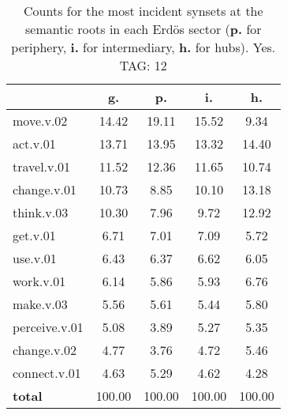 \begin{table}[h!]
\begin{center}
\begin{tabular}{| l || c | c | c | c |}\hline
 & {\bf g.} & {\bf p.} & {\bf i.} & {\bf h.} \\\hline\hline
move.v.02 & 14.42  & 19.11  & 15.52  & 9.34 \\\hline
act.v.01 & 13.71  & 13.95  & 13.32  & 14.40 \\\hline
travel.v.01 & 11.52  & 12.36  & 11.65  & 10.74 \\\hline
change.v.01 & 10.73  & 8.85  & 10.10  & 13.18 \\\hline
think.v.03 & 10.30  & 7.96  & 9.72  & 12.92 \\\hline
get.v.01 & 6.71  & 7.01  & 7.09  & 5.72 \\\hline
use.v.01 & 6.43  & 6.37  & 6.62  & 6.05 \\\hline
work.v.01 & 6.14  & 5.86  & 5.93  & 6.76 \\\hline
make.v.03 & 5.56  & 5.61  & 5.44  & 5.80 \\\hline
perceive.v.01 & 5.08  & 3.89  & 5.27  & 5.35 \\\hline
change.v.02 & 4.77  & 3.76  & 4.72  & 5.46 \\\hline
connect.v.01 & 4.63  & 5.29  & 4.62  & 4.28 \\\hline\hline
{{\bf total}} & 100.00  & 100.00  & 100.00  & 100.00 \\\hline
\end{tabular}
\caption{Counts for the most incident synsets at the semantic roots in each Erd\"os sector ({\bf p.} for periphery, {\bf i.} for intermediary, {\bf h.} for hubs). Yes. TAG: 12}
\end{center}
\end{table}